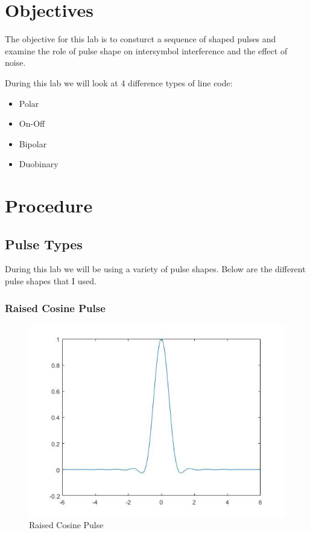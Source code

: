 \documentclass{article}
\begin{document}
\section{Objectives}
\indent
The objective for this lab is to consturct a sequence of shaped pulses and examine the role of pulse shape on intersymbol interference and the effect of noise.

\noindent
During this lab we will look at 4 difference types of line code:
  \begin{itemize}
    \item Polar
    \item On-Off
    \item Bipolar
    \item Duobinary
  \end{itemize}

\section{Procedure}

\subsection{Pulse Types}
During this lab we will be using a variety of pulse shapes. Below are the different pulse shapes that I used.

\subsubsection{Raised Cosine Pulse}
\begin{figure}[H]
  \begin{center}
    \includegraphics[width = 0.4\linewidth]{Raised_Cosine_Pulse.jpg}
    \caption{Raised Cosine Pulse}
    \label{fig:Raised_Cosine_Pulse}
  \end{center}
\end{figure}
\end{document}
